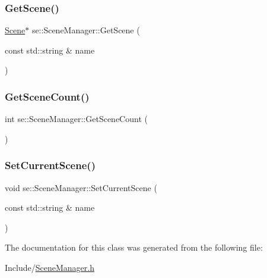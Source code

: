 \mbox{\label{classse_1_1_scene_manager_a07360d102e47455f497c844d7ad36ecb}} 
\subsubsection{\texorpdfstring{Get\+Scene()}{GetScene()}}
{\footnotesize\ttfamily \mbox{\hyperlink{classse_1_1_scene}{Scene}}$\ast$ se\+::\+Scene\+Manager\+::\+Get\+Scene (\begin{DoxyParamCaption}\item[{const std\+::string \&}]{name }\end{DoxyParamCaption})}

\mbox{\label{classse_1_1_scene_manager_aac6929d7dfd933c4d40fbf66b3740321}} 
\subsubsection{\texorpdfstring{Get\+Scene\+Count()}{GetSceneCount()}}
{\footnotesize\ttfamily int se\+::\+Scene\+Manager\+::\+Get\+Scene\+Count (\begin{DoxyParamCaption}{ }\end{DoxyParamCaption})}

\mbox{\label{classse_1_1_scene_manager_a8eff0a05036942247f81fe4915ffce50}} 
\subsubsection{\texorpdfstring{Set\+Current\+Scene()}{SetCurrentScene()}}
{\footnotesize\ttfamily void se\+::\+Scene\+Manager\+::\+Set\+Current\+Scene (\begin{DoxyParamCaption}\item[{const std\+::string \&}]{name }\end{DoxyParamCaption})}



The documentation for this class was generated from the following file\+:\begin{DoxyCompactItemize}
\item 
Include/\mbox{\hyperlink{_scene_manager_8h}{Scene\+Manager.\+h}}\end{DoxyCompactItemize}
